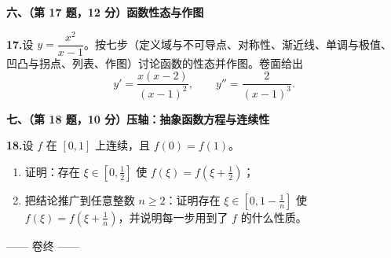 \documentclass[11pt,a4paper]{ctexart}
\begin{document}
\noindent\textbf{六、（第 17 题，12 分）函数性态与作图}

\noindent\textbf{17.}\quad 设 $y=\dfrac{x^2}{x-1}$。按七步（定义域与不可导点、对称性、渐近线、单调与极值、凹凸与拐点、列表、作图）讨论函数的性态并作图。卷面给出
\[ y'=\frac{x(x-2)}{(x-1)^2},\qquad y''=\frac{2}{(x-1)^3}. \]

\vspace{4pt}
\noindent\textbf{七、（第 18 题，10 分）压轴：抽象函数方程与连续性}

\noindent\textbf{18.}\quad 设 $f$ 在 $[0,1]$ 上连续，且 $f(0)=f(1)$。
\begin{enumerate}[label=(\arabic*),leftmargin=2.6em,itemsep=5pt]
\item 证明：存在 $\xi\in[0,\tfrac12]$ 使 $f(\xi)=f(\xi+\tfrac12)$；
\item 把结论推广到任意整数 $n\ge2$：证明存在 $\xi\in[0,1-\tfrac1n]$ 使 $f(\xi)=f(\xi+\tfrac1n)$，并说明每一步用到了 $f$ 的什么性质。
\end{enumerate}

\vspace{10pt}
\begin{center}
{\small —— 卷终 ——}
\end{center}
\end{document}
